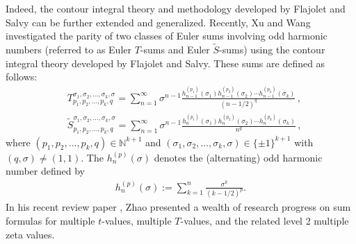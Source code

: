 \documentclass[11pt]{article}
\newcommand{\si}{\sigma}
\def\S{\widetilde{S}}
\theoremstyle{plain}
\theoremstyle{definition}
\begin{document}
Indeed, the contour integral theory and methodology developed by Flajolet and Salvy can be further extended and generalized. Recently, Xu and Wang \cite{Xu-Wang2020,Xu-Wang2023} investigated the parity of two classes of Euler sums involving odd harmonic numbers (referred to as Euler $T$-sums and Euler $\tilde{S}$-sums) using the contour integral theory developed by Flajolet and Salvy. These sums are defined as follows:
\begin{align}
&T_{p_1,p_2,\ldots,p_k,q}^{\si_1,\si_2,\ldots,\si_k,\si}
    =\sum_{n=1}^\infty\si^{n-1}\frac{h_{n-1}^{(p_1)}(\si_1)h_{n-1}^{(p_2)}(\si_2)\cdots
        h_{n-1}^{(p_k)}(\si_k)}{(n-1/2)^q}\,,\label{Tsum.Unify}\\
&\S_{p_1,p_2,\ldots,p_k,q}^{\si_1,\si_2,\ldots,\si_k,\si}
    =\sum_{n=1}^\infty\si^{n-1}\frac{h_n^{(p_1)}(\si_1)h_n^{(p_2)}(\si_2)\cdots
        h_n^{(p_k)}(\si_k)}{n^q}\,,\label{Stsum.Unify}
\end{align}
where $(p_1,p_2,\ldots,p_k,q)\in\mathbb{N}^{k+1}$ and $(\si_1,\si_2,\ldots,\si_k,\si)\in\{\pm 1\}^{k+1}$ with $(q,\si)\neq (1,1)$. The $h_n^{(p)}(\si)$ denotes the (alternating) odd harmonic number defined by
\begin{align*}
h_n^{(p)}(\si):=\sum_{k=1}^n \frac{\si^k}{(k-1/2)^p}.
\end{align*}
In his recent review paper \cite{Z2024}, Zhao presented a wealth of research progress on sum formulas for multiple $t$-values, multiple $T$-values, and the related level 2 multiple zeta values.
\end{document}

